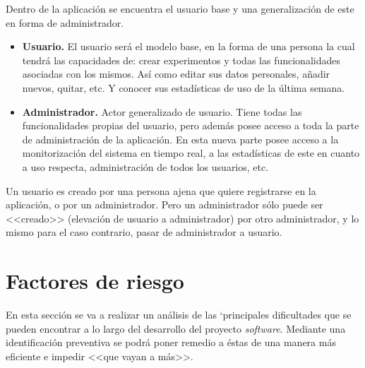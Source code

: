 Dentro de la aplicación se encuentra el usuario base y una generalización de este en forma de administrador. 
\begin{itemize}
\item \textbf{Usuario.} El usuario será el modelo base, en la forma de una persona la cual tendrá las capacidades de: crear experimentos y todas las funcionalidades asociadas con los mismos. Así como editar sus datos personales, añadir nuevos, quitar, etc. Y conocer sus estadísticas de uso de la última semana.

\item \textbf{Administrador.} Actor generalizado de usuario. Tiene todas las funcionalidades propias del usuario, pero además posee acceso a toda la parte de administración de la aplicación. En esta nueva parte posee acceso a la monitorización del sistema en tiempo real, a las estadísticas de este en cuanto a uso respecta, administración de todos los usuarios, etc. 
\end{itemize}

Un usuario es creado por una persona ajena que quiere registrarse en la aplicación, o por un administrador. Pero un administrador sólo puede ser <<creado>> (elevación de usuario a administrador) por otro administrador, y lo mismo para el caso contrario, pasar de administrador a usuario.


\section{Factores de riesgo}\label{factores-de-riesgo}
En esta sección se va a realizar un análisis de las `principales dificultades que se pueden encontrar a lo largo del desarrollo del proyecto \textit{software}. Mediante una identificación preventiva se podrá poner remedio a éstas de una manera más eficiente e impedir <<que vayan a más>>.

